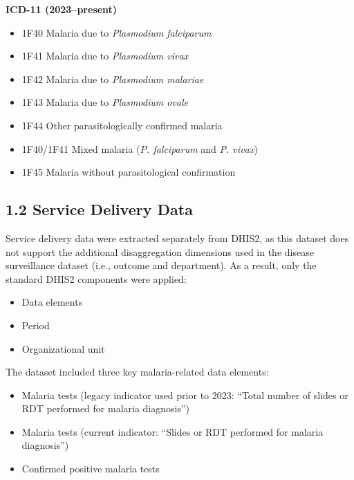 \documentclass[
  letterpaper,
  DIV=11,
  numbers=noendperiod]{scrartcl}
\providecommand{\tightlist}{%
  \setlength{\itemsep}{0pt}\setlength{\parskip}{0pt}}
\begin{document}
\textbf{ICD-11 (2023--present)}

\begin{itemize}
\item
  1F40 Malaria due to \emph{Plasmodium falciparum}\\
\item
  1F41 Malaria due to \emph{Plasmodium vivax}\\
\item
  1F42 Malaria due to \emph{Plasmodium malariae}\\
\item
  1F43 Malaria due to \emph{Plasmodium ovale}\\
\item
  1F44 Other parasitologically confirmed malaria\\
\item
  1F40/1F41 Mixed malaria (\emph{P. falciparum} and \emph{P. vivax})\\
\item
  1F45 Malaria without parasitological confirmation
\end{itemize}

\subsection{1.2 Service Delivery Data}\label{service-delivery-data}

Service delivery data were extracted separately from DHIS2, as this
dataset does not support the additional disaggregation dimensions used
in the disease surveillance dataset (i.e., outcome and department). As a
result, only the standard DHIS2 components were applied:

\begin{itemize}
\tightlist
\item
  Data elements\\
\item
  Period\\
\item
  Organizational unit
\end{itemize}

The dataset included three key malaria-related data elements:

\begin{itemize}
\tightlist
\item
  Malaria tests (legacy indicator used prior to 2023: ``Total number of
  slides or RDT performed for malaria diagnosis'')\\
\item
  Malaria tests (current indicator: ``Slides or RDT performed for
  malaria diagnosis'')\\
\item
  Confirmed positive malaria tests
\end{itemize}
\end{document}
